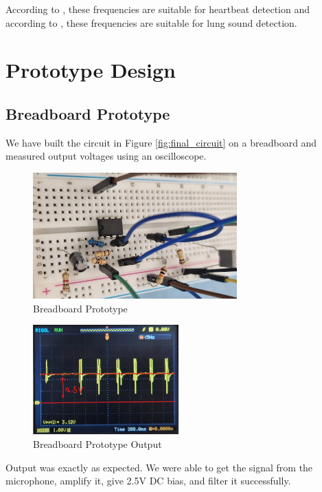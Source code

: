 According to \textcite{Debbal2020}, these frequencies are suitable for heartbeat detection and according to \textcite{Gross2000}, these frequencies are suitable for lung sound detection.

\newpage
\thispagestyle{plain}

\section{Prototype Design}

\subsection{Breadboard Prototype}
We have built the circuit in Figure \ref{fig:final_circuit} on a breadboard and measured output voltages using an oscilloscope.

\begin{figure}[h]
    \centering
    \includegraphics[width=0.7\textwidth]{assets/breadboard.png}
    \caption{Breadboard Prototype}
    \label{fig:breadboard_prototype}
\end{figure}

\begin{figure}[h]
    \centering
    \includegraphics[width=0.5\textwidth]{assets/breadboard-output.png}
    \caption{Breadboard Prototype Output}
    \label{fig:breadboard_prototype_output}
\end{figure}

Output was exactly as expected. We were able to get the signal from the microphone, amplify it, give 2.5V DC bias, and filter it successfully.


